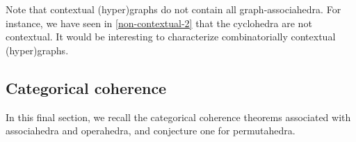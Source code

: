 \begin{remark}
  Note that contextual (hyper)graphs do not contain all graph-associahedra.
  For instance, we have seen in \cref{non-contextual-2} that the cyclohedra are not contextual. 
  It would be interesting to characterize combinatorially contextual (hyper)graphs.
\end{remark}


\subsection{Categorical coherence}
\label{ss:coherence}

In this final section, we recall the categorical coherence theorems associated with associahedra and operahedra, and conjecture one for permutahedra.


